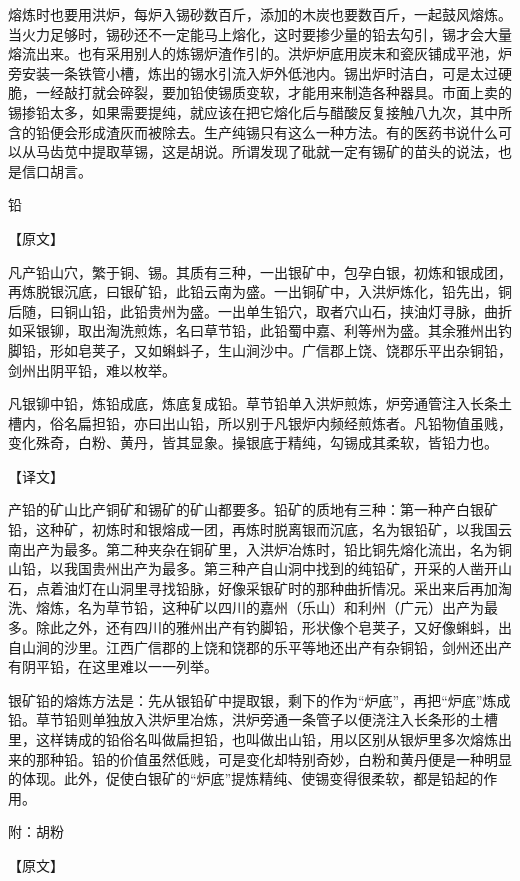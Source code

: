 \documentclass[12pt,UTF8]{ctexbook}
\begin{document}
熔炼时也要用洪炉，每炉入锡砂数百斤，添加的木炭也要数百斤，一起鼓风熔炼。当火力足够时，锡砂还不一定能马上熔化，这时要掺少量的铅去勾引，锡才会大量熔流出来。也有采用别人的炼锡炉渣作引的。洪炉炉底用炭末和瓷灰铺成平池，炉旁安装一条铁管小槽，炼出的锡水引流入炉外低池内。锡出炉时洁白，可是太过硬脆，一经敲打就会碎裂，要加铅使锡质变软，才能用来制造各种器具。市面上卖的锡掺铅太多，如果需要提纯，就应该在把它熔化后与醋酸反复接触八九次，其中所含的铅便会形成渣灰而被除去。生产纯锡只有这么一种方法。有的医药书说什么可以从马齿苋中提取草锡，这是胡说。所谓发现了砒就一定有锡矿的苗头的说法，也是信口胡言。

铅

【原文】

凡产铅山穴，繁于铜、锡。其质有三种，一出银矿中，包孕白银，初炼和银成团，再炼脱银沉底，曰银矿铅，此铅云南为盛。一出铜矿中，入洪炉炼化，铅先出，铜后随，曰铜山铅，此铅贵州为盛。一出单生铅穴，取者穴山石，挟油灯寻脉，曲折如采银铆，取出淘洗煎炼，名曰草节铅，此铅蜀中嘉、利等州为盛。其余雅州出钓脚铅，形如皂荚子，又如蝌蚪子，生山涧沙中。广信郡上饶、饶郡乐平出杂铜铅，剑州出阴平铅，难以枚举。

凡银铆中铅，炼铅成底，炼底复成铅。草节铅单入洪炉煎炼，炉旁通管注入长条土槽内，俗名扁担铅，亦曰出山铅，所以别于凡银炉内频经煎炼者。凡铅物值虽贱，变化殊奇，白粉、黄丹，皆其显象。操银底于精纯，勾锡成其柔软，皆铅力也。

【译文】

产铅的矿山比产铜矿和锡矿的矿山都要多。铅矿的质地有三种：第一种产白银矿铅，这种矿，初炼时和银熔成一团，再炼时脱离银而沉底，名为银铅矿，以我国云南出产为最多。第二种夹杂在铜矿里，入洪炉冶炼时，铅比铜先熔化流出，名为铜山铅，以我国贵州出产为最多。第三种产自山洞中找到的纯铅矿，开采的人凿开山石，点着油灯在山洞里寻找铅脉，好像采银矿时的那种曲折情况。采出来后再加淘洗、熔炼，名为草节铅，这种矿以四川的嘉州（乐山）和利州（广元）出产为最多。除此之外，还有四川的雅州出产有钓脚铅，形状像个皂荚子，又好像蝌蚪，出自山涧的沙里。江西广信郡的上饶和饶郡的乐平等地还出产有杂铜铅，剑州还出产有阴平铅，在这里难以一一列举。

银矿铅的熔炼方法是：先从银铅矿中提取银，剩下的作为“炉底”，再把“炉底”炼成铅。草节铅则单独放入洪炉里冶炼，洪炉旁通一条管子以便浇注入长条形的土槽里，这样铸成的铅俗名叫做扁担铅，也叫做出山铅，用以区别从银炉里多次熔炼出来的那种铅。铅的价值虽然低贱，可是变化却特别奇妙，白粉和黄丹便是一种明显的体现。此外，促使白银矿的“炉底”提炼精纯、使锡变得很柔软，都是铅起的作用。

附：胡粉

【原文】
\end{document}
